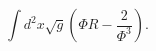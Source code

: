 \begin{equation}
\int d^{2}x\sqrt{g}\left( \Phi R-\frac{2}{\Phi ^{3}}\right) .  \label{2Dflat}
\end{equation}

